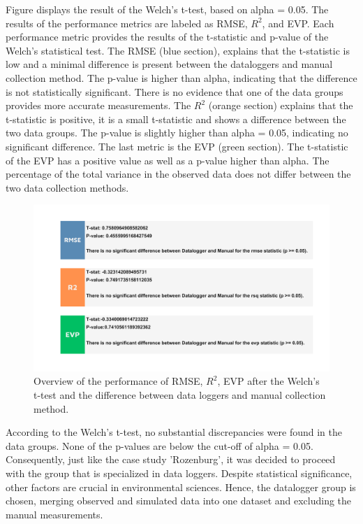 Figure  displays the result of the Welch's t-test, based on alpha = 0.05. The results of the performance metrics are labeled as RMSE, $R^2$, and EVP. Each performance metric provides the results of the t-statistic and p-value of the Welch's statistical test. The RMSE (blue section), explains that the t-statistic is low and a minimal difference is present between the dataloggers and manual collection method. The p-value is higher than alpha, indicating that the difference is not statistically significant. There is no evidence that one of the data groups provides more accurate measurements. The $R^2$ (orange section) explains that the t-statistic is positive, it is a small t-statistic and shows a difference between the two data groups. The p-value is slightly higher than alpha = 0.05, indicating no significant difference. The last metric is the EVP (green section). The t-statistic of the EVP has a positive value as well as a p-value higher than alpha. The percentage of the total variance in the observed data does not differ between the two data collection methods.

\clearpage

\begin{figure}[htbp]
    \centering
    \includegraphics[width=0.80\linewidth]{frontmatter/Heijplaat-fig/heijstat.pdf}
    \caption{Overview of the performance of RMSE, $R^2$, EVP after the Welch's t-test and the difference between data loggers and manual collection method.} 
    \label{welchheij}
\end{figure}

According to the Welch's t-test, no substantial discrepancies were found in the data groups. None of the p-values are below the cut-off of alpha = 0.05. Consequently, just like the case study 'Rozenburg', it was decided to proceed with the group that is specialized in data loggers. Despite statistical significance, other factors are crucial in environmental sciences. Hence, the datalogger group is chosen, merging observed and simulated data into one dataset and excluding the manual measurements.

